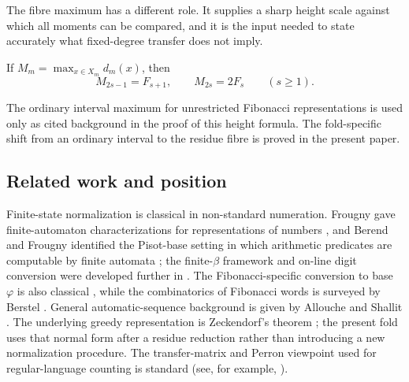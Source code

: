 The fibre maximum has a different role.  It supplies a sharp height scale
against which all moments can be compared, and it is the input needed to
state accurately what fixed-degree transfer does not imply.
\begin{theorem}
\label{thm:intro-height}
If \(M_m=\max_{x\in X_m}d_m(x)\), then
\[
 M_{2s-1}=F_{s+1},\qquad M_{2s}=2F_s\qquad(s\ge1).
\]
\end{theorem}

The ordinary interval maximum for unrestricted Fibonacci representations is
used only as cited background in the proof of this height formula.  The
fold-specific shift from an ordinary interval to the residue fibre is proved
in the present paper.

\subsection{Related work and position}
Finite-state normalization is classical in non-standard numeration.  Frougny
gave finite-automaton characterizations for representations of numbers
\cite{Frougny1992Representations}, and Berend and Frougny identified the
Pisot-base setting in which arithmetic predicates are computable by finite
automata \cite{BerendFrougny1994Pisot}; the finite-$\beta$ framework and
on-line digit conversion were developed further in
\cite{FrougnySolomyak1992FiniteBeta,Frougny1999OnlineAddition,Frougny2003DigitSet}.
The Fibonacci-specific conversion to base $\varphi$ is also classical
\cite{FrougnySakarovitch1999FibonacciPhi}, while the combinatorics of
Fibonacci words is surveyed by Berstel \cite{Berstel1986FibonacciWords}.
General automatic-sequence background is given by Allouche and Shallit
\cite{AlloucheShallit2003AutomaticSequences}.
The underlying greedy representation is Zeckendorf's theorem
\cite{Zeckendorf1972}; the present fold uses that normal form after a residue
reduction rather than introducing a new normalization procedure.
The transfer-matrix and Perron viewpoint used for regular-language counting
is standard (see, for example, \cite{FlajoletSedgewick2009}).

